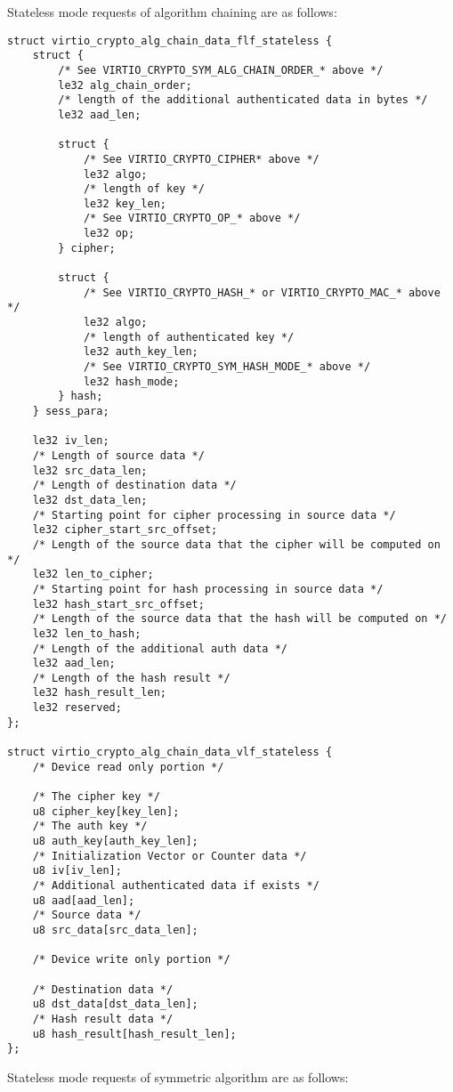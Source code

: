 Stateless mode requests of algorithm chaining are as follows:

\begin{lstlisting}
struct virtio_crypto_alg_chain_data_flf_stateless {
    struct {
        /* See VIRTIO_CRYPTO_SYM_ALG_CHAIN_ORDER_* above */
        le32 alg_chain_order;
        /* length of the additional authenticated data in bytes */
        le32 aad_len;

        struct {
            /* See VIRTIO_CRYPTO_CIPHER* above */
            le32 algo;
            /* length of key */
            le32 key_len;
            /* See VIRTIO_CRYPTO_OP_* above */
            le32 op;
        } cipher;

        struct {
            /* See VIRTIO_CRYPTO_HASH_* or VIRTIO_CRYPTO_MAC_* above */
            le32 algo;
            /* length of authenticated key */
            le32 auth_key_len;
            /* See VIRTIO_CRYPTO_SYM_HASH_MODE_* above */
            le32 hash_mode;
        } hash;
    } sess_para;

    le32 iv_len;
    /* Length of source data */
    le32 src_data_len;
    /* Length of destination data */
    le32 dst_data_len;
    /* Starting point for cipher processing in source data */
    le32 cipher_start_src_offset;
    /* Length of the source data that the cipher will be computed on */
    le32 len_to_cipher;
    /* Starting point for hash processing in source data */
    le32 hash_start_src_offset;
    /* Length of the source data that the hash will be computed on */
    le32 len_to_hash;
    /* Length of the additional auth data */
    le32 aad_len;
    /* Length of the hash result */
    le32 hash_result_len;
    le32 reserved;
};

struct virtio_crypto_alg_chain_data_vlf_stateless {
    /* Device read only portion */

    /* The cipher key */
    u8 cipher_key[key_len];
    /* The auth key */
    u8 auth_key[auth_key_len];
    /* Initialization Vector or Counter data */
    u8 iv[iv_len];
    /* Additional authenticated data if exists */
    u8 aad[aad_len];
    /* Source data */
    u8 src_data[src_data_len];

    /* Device write only portion */

    /* Destination data */
    u8 dst_data[dst_data_len];
    /* Hash result data */
    u8 hash_result[hash_result_len];
};
\end{lstlisting}

Stateless mode requests of symmetric algorithm are as follows:

